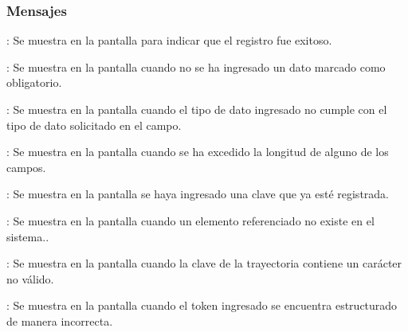 \subsubsection{Mensajes}

\begin{Citemize}
	\item {}: Se muestra en la pantalla  para indicar que el registro fue exitoso.
	\item {}: Se muestra en la pantalla  cuando no se ha ingresado un dato marcado como obligatorio.
	\item {}: Se muestra en la pantalla  cuando el tipo de dato ingresado no cumple con el tipo de dato solicitado en el campo.
	\item {}: Se muestra en la pantalla  cuando se ha excedido la longitud de alguno de los campos.
	\item {}: Se muestra en la pantalla  se haya ingresado una clave que ya esté registrada.
	\item {}: Se muestra en la pantalla  cuando un elemento referenciado no existe en el sistema..
	\item {}: Se muestra en la pantalla  cuando la clave de la trayectoria contiene un carácter no válido.
	\item {}: Se muestra en la pantalla  cuando el token ingresado se encuentra estructurado de manera incorrecta.
\end{Citemize}
